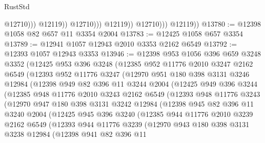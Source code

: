 \begin{lexlean}{RustStd}
\begin{coremodule}
                                  @12710)))
                            @12119))
                        @12710)))
                  @12119))
              @12710)))
        @12119))
@13780 := @12398 @1058 @82 @657 @11 @3354 @2004
@13783 := @12425 @1058 @657 @3354
@13789 := @12941 @1057 @12943 @2010 @3353 @2162 @6549
@13792 := @12393 @1057 @12943 @3353
@13946 := @12398
    @953
    @1056
    @396
    @659
    @3248
    @3352
    (@12425
      @953
      @396
      @3248
      (@12385
        @952
        @11776
        @2010
        @3247
        @2162
        @6549
        (@12393
          @952
          @11776
          @3247
          (@12970
            @951
            @180
            @398
            @3131
            @3246
            @12984
            (@12398
              @949
              @82
              @396
              @11
              @3244
              @2004
              (@12425
                @949
                @396
                @3244
                (@12385
                  @948
                  @11776
                  @2010
                  @3243
                  @2162
                  @6549
                  (@12393
                    @948
                    @11776
                    @3243
                    (@12970
                      @947
                      @180
                      @398
                      @3131
                      @3242
                      @12984
                      (@12398
                        @945
                        @82
                        @396
                        @11
                        @3240
                        @2004
                        (@12425
                          @945
                          @396
                          @3240
                          (@12385
                            @944
                            @11776
                            @2010
                            @3239
                            @2162
                            @6549
                            (@12393
                              @944
                              @11776
                              @3239
                              (@12970
                                @943
                                @180
                                @398
                                @3131
                                @3238
                                @12984
                                (@12398
                                  @941
                                  @82
                                  @396
                                  @11

\end{coremodule}
\end{lexlean}
